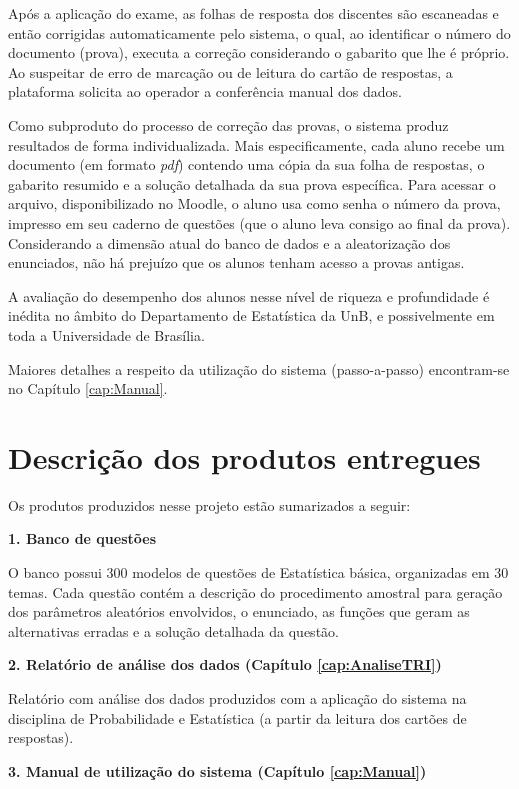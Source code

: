 \documentclass[a4paper]{report}
\begin{document}
Após a aplicação do exame, as folhas de resposta dos discentes são
escaneadas e então corrigidas automaticamente pelo sistema, o qual, ao
identificar o número do documento (prova), executa a correção
considerando o gabarito que lhe é próprio. Ao suspeitar de erro de
marcação ou de leitura do cartão de respostas, a plataforma solicita ao
operador a conferência manual dos dados.

Como subproduto do processo de correção das provas, o sistema produz
resultados de forma individualizada. Mais especificamente, cada aluno
recebe um documento (em formato \emph{pdf}) contendo uma cópia da sua
folha de respostas, o gabarito resumido e a solução detalhada da sua
prova específica. Para acessar o arquivo, disponibilizado no Moodle, o
aluno usa como senha o número da prova, impresso em seu caderno de
questões (que o aluno leva consigo ao final da prova). Considerando a
dimensão atual do banco de dados e a aleatorização dos enunciados, não
há prejuízo que os alunos tenham acesso a provas antigas.

A avaliação do desempenho dos alunos nesse nível de riqueza e
profundidade é inédita no âmbito do Departamento de Estatística da UnB,
e possivelmente em toda a Universidade de Brasília.

Maiores detalhes a respeito da utilização do sistema (passo-a-passo)
encontram-se no Capítulo \ref{cap:Manual}.

\section{Descrição dos produtos entregues}

Os produtos produzidos nesse projeto estão sumarizados a seguir:

\textbf{1. Banco de questões}

O banco possui 300 modelos de questões de Estatística básica,
organizadas em 30 temas. Cada questão contém a descrição do procedimento
amostral para geração dos parâmetros aleatórios envolvidos, o enunciado,
as funções que geram as alternativas erradas e a solução detalhada da
questão.

\textbf{2. Relatório de análise dos dados (Capítulo
\ref{cap:AnaliseTRI})}

Relatório com análise dos dados produzidos com a aplicação do sistema na
disciplina de Probabilidade e Estatística (a partir da leitura dos
cartões de respostas).

\textbf{3. Manual de utilização do sistema (Capítulo \ref{cap:Manual})}
\end{document}
